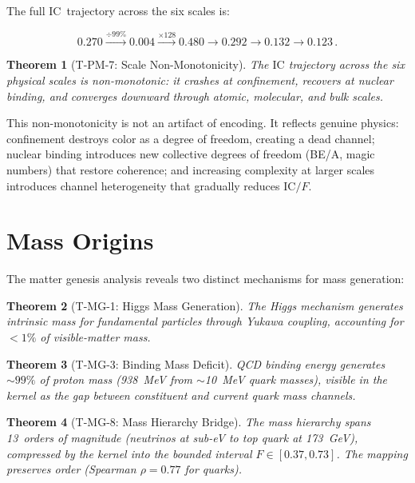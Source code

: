 \documentclass[
  aps,
  prd,
  twocolumn,
  superscriptaddress,
  nofootinbib,
  floatfix
]{revtex4-2}
\newtheorem{theorem}{Theorem}
\newcommand{\beq}{\begin{equation}}
\newcommand{\eeq}{\end{equation}}
\newcommand{\IC}{\mathrm{IC}}
\begin{document}
The full $\IC$~trajectory across the six scales is:

\beq\label{eq:trajectory}
  0.270 \xrightarrow{\div 99\%} 0.004
  \xrightarrow{\times 128} 0.480
  \xrightarrow{} 0.292
  \xrightarrow{} 0.132
  \xrightarrow{} 0.123\,.
\eeq

\begin{theorem}[T-PM-7: Scale Non-Monotonicity]
\label{thm:nonmono}
The $\IC$ trajectory across the six physical scales is
non-monotonic: it crashes at confinement, recovers at
nuclear binding, and converges downward through atomic,
molecular, and bulk scales.
\end{theorem}

This non-monotonicity is not an artifact of encoding.
It reflects genuine physics: confinement destroys color as a
degree of freedom, creating a dead channel; nuclear binding
introduces new collective degrees of freedom (BE/A, magic
numbers) that restore coherence; and increasing complexity at
larger scales introduces channel heterogeneity that gradually
reduces $\IC/F$.

\section{Mass Origins}\label{sec:mass}

The matter genesis analysis reveals two distinct mechanisms
for mass generation:

\begin{theorem}[T-MG-1: Higgs Mass Generation]
\label{thm:higgs}
The Higgs mechanism generates \emph{intrinsic} mass for
fundamental particles through Yukawa coupling, accounting
for $< 1\%$ of visible-matter mass.
\end{theorem}

\begin{theorem}[T-MG-3: Binding Mass Deficit]
\label{thm:binding}
QCD binding energy generates $\sim 99\%$ of proton mass
(938~MeV from $\sim$10~MeV quark masses), visible in the
kernel as the gap between constituent and current quark
mass channels.
\end{theorem}

\begin{theorem}[T-MG-8: Mass Hierarchy Bridge]
\label{thm:hierarchy}
The mass hierarchy spans 13~orders of magnitude (neutrinos
at sub-eV to top quark at 173~GeV), compressed by the kernel
into the bounded interval $F \in [0.37, 0.73]$.  The mapping
preserves order (Spearman $\rho = 0.77$ for quarks).
\end{theorem}
\end{document}
